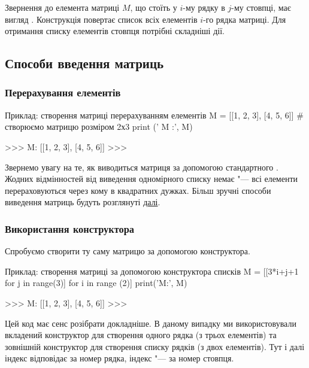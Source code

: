 Звернення до елемента матриці $ M $, що стоїть у $ i $-му рядку в $ j $-му стовпці, має вигляд . Конструкція  повертає список всіх елементів $ i $-го рядка матриці. Для отримання списку елементів стовпця потрібні складніші дії.

\subsection{Способи введення матриць}

\subsubsection{Перерахування елементів}

\begin{pyr}
\begin{py}{Приклад: створення матриці перерахуванням елементів}
M = [[1, 2, 3], [4, 5, 6]] # створюємо матрицю розміром 2х3
print (' M :', M)
\end{py}
\tcblower
\begin{py}{}
>>>
M: [[1, 2, 3], [4, 5, 6]]
>>>
\end{py}
\end{pyr}
\noindent Звернемо увагу на те, як виводиться матриця за допомогою стандартного . Жодних відмінностей від виведення одномірного списку немає "--- всі елементи перераховуються через кому в квадратних дужках. Більш зручні способи виведення матриць будуть розглянуті \hyperref [moutput]{далі}.

\subsubsection{Використання конструктора}

Спробуємо створити ту саму матрицю за допомогою конструктора.

\begin{pyr}
\begin{py}{Приклад: створення матриці за допомогою конструктора списків}
M = [[3*i+j+1 for j in range(3)] for i in range (2)]
print('M:', M)
\end{py}
\tcblower
\begin{py}{}
>>>
M: [[1, 2, 3], [4, 5, 6]]
>>>
\end{py}
\end{pyr}
\noindent Цей код має сенс розібрати докладніше. В даному випадку ми використовували вкладений конструктор для створення одного рядка (з трьох елементів) та зовнішній конструктор для створення списку рядків (з двох елементів). Тут і далі індекс \mi{[i]} відповідає за номер рядка, індекс \mi{[j]} "--- за номер стовпця.

